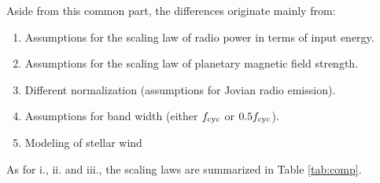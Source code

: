 \documentclass[iop,numberedappendix,apj]{emulateapj}
\begin{document}
Aside from this common part, the differences originate mainly from:
\renewcommand{\theenumi}{\roman{enumi}}
\begin{enumerate}
\item Assumptions for the scaling law of radio power in terms of input energy. 
\item Assumptions for the scaling law of planetary magnetic field strength. 
\item Different normalization (assumptions for Jovian radio emission). 
\item Assumptions for band width (either $f_{\rm cyc}$ or $0.5f_{\rm cyc}$). 
\item Modeling of stellar wind
\end{enumerate}

As for i., ii. and iii., the scaling laws are summarized in Table \ref{tab:comp}. 
\end{document}
